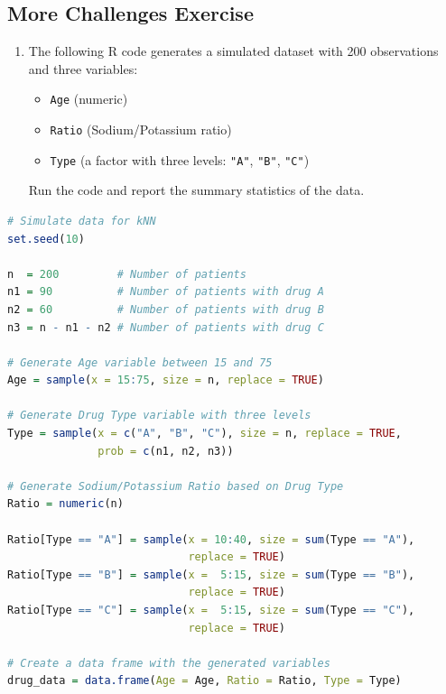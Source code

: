 \documentclass[
]{book}
\newcommand{\passthrough}[1]{#1}
\providecommand{\tightlist}{%
  \setlength{\itemsep}{0pt}\setlength{\parskip}{0pt}}
\theoremstyle{definition}
\theoremstyle{definition}
\theoremstyle{definition}
\theoremstyle{definition}
\theoremstyle{remark}
\begin{document}
\subsection*{More Challenges Exercise}\label{more-challenges-exercise-1}

\begin{enumerate}
\def\labelenumi{\arabic{enumi}.}
\setcounter{enumi}{20}
\tightlist
\item
  The following R code generates a simulated dataset with 200 observations and three variables:

  \begin{itemize}
  \tightlist
  \item
    \passthrough{\lstinline!Age!} (numeric)\\
  \item
    \passthrough{\lstinline!Ratio!} (Sodium/Potassium ratio)\\
  \item
    \passthrough{\lstinline!Type!} (a factor with three levels: \passthrough{\lstinline!"A"!}, \passthrough{\lstinline!"B"!}, \passthrough{\lstinline!"C"!})
  \end{itemize}

  Run the code and report the summary statistics of the data.
\end{enumerate}

\begin{lstlisting}[language=R]
# Simulate data for kNN
set.seed(10)

n  = 200         # Number of patients
n1 = 90          # Number of patients with drug A
n2 = 60          # Number of patients with drug B 
n3 = n - n1 - n2 # Number of patients with drug C

# Generate Age variable between 15 and 75
Age = sample(x = 15:75, size = n, replace = TRUE)

# Generate Drug Type variable with three levels
Type = sample(x = c("A", "B", "C"), size = n, replace = TRUE, 
              prob = c(n1, n2, n3))

# Generate Sodium/Potassium Ratio based on Drug Type
Ratio = numeric(n)

Ratio[Type == "A"] = sample(x = 10:40, size = sum(Type == "A"), 
                            replace = TRUE)
Ratio[Type == "B"] = sample(x =  5:15, size = sum(Type == "B"), 
                            replace = TRUE)
Ratio[Type == "C"] = sample(x =  5:15, size = sum(Type == "C"), 
                            replace = TRUE)

# Create a data frame with the generated variables
drug_data = data.frame(Age = Age, Ratio = Ratio, Type = Type)
\end{lstlisting}
\end{document}
